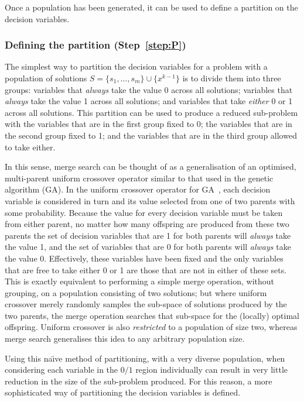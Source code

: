 \documentclass[journal]{IEEEtran}
\begin{document}
Once a population has been generated, it can be used to define a partition on the decision variables.

\subsubsection*{\bf Defining the partition (Step~\ref{step:P})}

The simplest way to partition the decision variables for a problem with a population of solutions $S = \{s_1,\dots,s_m\}\cup \{x^{k-1}\}$ is to divide them into three groups: variables that \emph{always} take the value 0 across all solutions; variables that \emph{always} take the value 1 across all solutions; and variables that take \emph{either} 0 or 1 across all solutions. This partition can be used to produce a reduced sub-problem with the variables that are in the first group fixed to 0; the variables that are in the second group fixed to 1; and the variables that are in the third group allowed to take either.

In this sense, merge search can be thought of as a generalisation of an optimised, multi-parent uniform crossover operator similar to that used in the genetic algorithm (GA). In the uniform crossover operator for GA~\cite{meta-essentials}, each decision variable is considered in turn and its value selected from one of two parents with some probability. Because the value for every decision variable must be taken from either parent, no matter how many offspring are produced from these two parents the set of decision variables that are 1 for both parents will \emph{always} take the value 1, and the set of variables that are 0 for both parents will \emph{always} take the value 0. Effectively, these variables have been fixed and the only variables that are free to take either 0 or 1 are those that are not in either of these sets. This is exactly equivalent to performing a simple merge operation, without grouping, on a population consisting of two solutions; but where uniform crossover merely randomly samples the sub-space of solutions produced by the two parents, the merge operation searches that sub-space for the (locally) optimal offspring. Uniform crossover is also \emph{restricted} to a population of size two, whereas merge search generalises this idea to any arbitrary population size.

Using this na{\"\i}ve method of partitioning, with a very diverse population, when considering each variable in the $0/1$ region individually can result in very little reduction in the size of the sub-problem produced. For this reason, a more sophisticated way of partitioning the decision variables is defined.
\end{document}
